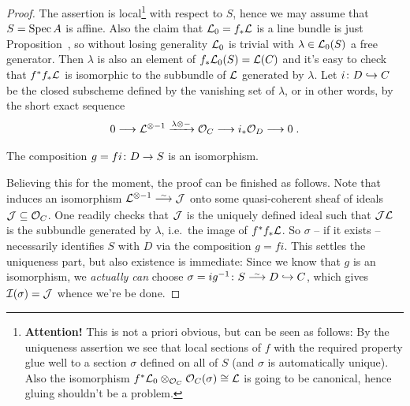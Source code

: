 \documentclass[a4paper,parskip=half,numbers=enddot, DIV=12]{scrreprt}
\begin{document}
\begin{proof}
	The assertion is local\footnote{\textbf{Attention!} This is not a priori obvious, but can be seen as follows: By the uniqueness assertion we see that local sections of $f$ with the required property glue well to a section $\sigma$ defined on all of $S$ (and $\sigma$ is automatically unique). Also the isomorphism $f^*\mathcal{L}_0\otimes_{\mathcal{O}_C}\mathcal{O}_C(\sigma)\cong\mathcal{L}$ is going to be canonical, hence gluing shouldn't be a problem.} with respect to $S$, hence we may assume that $S=\operatorname{Spec} A$ is affine. Also the claim that $\mathcal{L}_0=f_*\mathcal{L}$ is a line bundle is just Proposition~, so without losing generality $\mathcal{L}_0$ is trivial with $\lambda\in\mathcal{L}_0(S)$ a free generator. Then $\lambda$ is also an element of $f_*\mathcal{L}_0(S)=\mathcal{L}(C)$ and it's easy to check that $f^*f_*\mathcal{L}$ is isomorphic to the subbundle of $\mathcal{L}$ generated by $\lambda$. Let $i\colon D\monomorphism C$ be the closed subscheme defined by the vanishing set of $\lambda$, or in other words, by the short exact sequence
	\begin{align}\lbl{eq:SESforD}
		0\morphism\Ll^{\otimes -1}\xrightarrow{\lambda\otimes-}\Oo_C\morphism i_*\Oo_D\morphism 0\;.
	\end{align}
	\begin{claim}
		The composition $g=fi\colon D\morphism S$ is an isomorphism.
	\end{claim}
	Believing this for the moment, the proof can be finished as follows. Note that  induces an isomorphism $\Ll^{\otimes -1}\isomorphism\Jj$ onto some quasi-coherent sheaf of ideals $\mathcal{J}\subseteq \mathcal{O}_C$. One readily checks that $\mathcal{J}$ is the uniquely defined ideal such that $\mathcal{J}\mathcal{L}$ is the subbundle generated by $\lambda$, i.e.\ the image of $f^*f_*\mathcal{L}$. So $\sigma$ -- if it exists -- necessarily identifies $S$ with $D$ via the composition $g=fi$. This settles the uniqueness part, but also existence is immediate: Since we know that $g$ is an isomorphism, we \emph{actually can} choose $\sigma=ig^{-1}\colon S\isomorphism D\monomorphism C$, which gives $\mathcal{I}(\sigma)=\mathcal{J}$ whence we're be done.
	

\end{proof}
\end{document}

